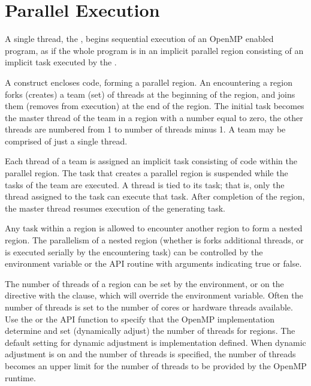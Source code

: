 \pagebreak
\chapter{Parallel Execution}
\label{chap:parallel_execution}

A single thread, the , begins sequential execution of 
an OpenMP enabled program, as if the whole program is in an implicit parallel
region consisting of an implicit task executed by the .

A  construct encloses code, 
forming a parallel region.  An  encountering a  
region forks (creates) a team (set) of threads at the beginning of the 
 region, and joins them (removes from execution) at the 
end of the region.  The initial task becomes the master thread of the team in a 
 region with a  number equal to zero, the other 
threads are numbered from 1 to number of threads minus 1. 
A team may be comprised of just a single thread.

Each thread of a team is assigned an implicit task consisting of code within the 
parallel region. The task that creates a parallel region is suspended while the
tasks of the team are executed.  A thread is tied to its task; that is,
only the thread assigned to the task can execute that task.  After completion 
of the  region, the master thread resumes execution of the generating task.  


Any task within a  region is allowed to encounter another
 region to form a nested  region. The 
parallelism of a nested  region (whether is forks additional 
threads, or is executed serially by the encountering task) can be controlled by the
 environment variable or the  
API routine with arguments indicating true or false.

The number of threads of a  region can be set by the 
environment, or on the  directive with the 
clause, which will override the environment variable. Often the number of threads
is set to the number of cores or hardware threads available.  Use the 
or the  API function to specify that the OpenMP
implementation determine and set (dynamically adjust) the number of threads for
 regions.  The default setting for dynamic adjustment is implementation
defined. When dynamic adjustment is on and the number of threads is specified,
the number of threads becomes an upper limit for the number of threads to be
provided by the OpenMP runtime.

